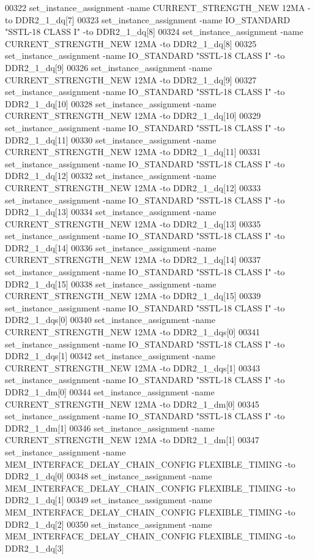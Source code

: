 \begin{DoxyCode}
00322 set\_instance\_assignment -name CURRENT\_STRENGTH\_NEW 12MA -to DDR2\_1\_dq[7]
00323 set\_instance\_assignment -name IO\_STANDARD "SSTL-18 CLASS I" -to DDR2\_1\_dq[8]
00324 set\_instance\_assignment -name CURRENT\_STRENGTH\_NEW 12MA -to DDR2\_1\_dq[8]
00325 set\_instance\_assignment -name IO\_STANDARD "SSTL-18 CLASS I" -to DDR2\_1\_dq[9]
00326 set\_instance\_assignment -name CURRENT\_STRENGTH\_NEW 12MA -to DDR2\_1\_dq[9]
00327 set\_instance\_assignment -name IO\_STANDARD "SSTL-18 CLASS I" -to DDR2\_1\_dq[10]
00328 set\_instance\_assignment -name CURRENT\_STRENGTH\_NEW 12MA -to DDR2\_1\_dq[10]
00329 set\_instance\_assignment -name IO\_STANDARD "SSTL-18 CLASS I" -to DDR2\_1\_dq[11]
00330 set\_instance\_assignment -name CURRENT\_STRENGTH\_NEW 12MA -to DDR2\_1\_dq[11]
00331 set\_instance\_assignment -name IO\_STANDARD "SSTL-18 CLASS I" -to DDR2\_1\_dq[12]
00332 set\_instance\_assignment -name CURRENT\_STRENGTH\_NEW 12MA -to DDR2\_1\_dq[12]
00333 set\_instance\_assignment -name IO\_STANDARD "SSTL-18 CLASS I" -to DDR2\_1\_dq[13]
00334 set\_instance\_assignment -name CURRENT\_STRENGTH\_NEW 12MA -to DDR2\_1\_dq[13]
00335 set\_instance\_assignment -name IO\_STANDARD "SSTL-18 CLASS I" -to DDR2\_1\_dq[14]
00336 set\_instance\_assignment -name CURRENT\_STRENGTH\_NEW 12MA -to DDR2\_1\_dq[14]
00337 set\_instance\_assignment -name IO\_STANDARD "SSTL-18 CLASS I" -to DDR2\_1\_dq[15]
00338 set\_instance\_assignment -name CURRENT\_STRENGTH\_NEW 12MA -to DDR2\_1\_dq[15]
00339 set\_instance\_assignment -name IO\_STANDARD "SSTL-18 CLASS I" -to DDR2\_1\_dqs[0]
00340 set\_instance\_assignment -name CURRENT\_STRENGTH\_NEW 12MA -to DDR2\_1\_dqs[0]
00341 set\_instance\_assignment -name IO\_STANDARD "SSTL-18 CLASS I" -to DDR2\_1\_dqs[1]
00342 set\_instance\_assignment -name CURRENT\_STRENGTH\_NEW 12MA -to DDR2\_1\_dqs[1]
00343 set\_instance\_assignment -name IO\_STANDARD "SSTL-18 CLASS I" -to DDR2\_1\_dm[0]
00344 set\_instance\_assignment -name CURRENT\_STRENGTH\_NEW 12MA -to DDR2\_1\_dm[0]
00345 set\_instance\_assignment -name IO\_STANDARD "SSTL-18 CLASS I" -to DDR2\_1\_dm[1]
00346 set\_instance\_assignment -name CURRENT\_STRENGTH\_NEW 12MA -to DDR2\_1\_dm[1]
00347 set\_instance\_assignment -name MEM\_INTERFACE\_DELAY\_CHAIN\_CONFIG FLEXIBLE\_TIMING -to DDR2\_1\_dq[0]
00348 set\_instance\_assignment -name MEM\_INTERFACE\_DELAY\_CHAIN\_CONFIG FLEXIBLE\_TIMING -to DDR2\_1\_dq[1]
00349 set\_instance\_assignment -name MEM\_INTERFACE\_DELAY\_CHAIN\_CONFIG FLEXIBLE\_TIMING -to DDR2\_1\_dq[2]
00350 set\_instance\_assignment -name MEM\_INTERFACE\_DELAY\_CHAIN\_CONFIG FLEXIBLE\_TIMING -to DDR2\_1\_dq[3]

\end{DoxyCode}
